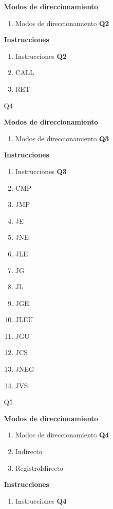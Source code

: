 \textbf{Modos de direccionamiento}
\begin{enumerate}
\item Modos de direccionamiento \textbf{Q2}
\end{enumerate}

\textbf{Instrucciones}
\begin{enumerate}
\item Instrucciones \textbf{Q2}
\item CALL
\item RET
\end{enumerate}

{Q4}

\textbf{Modos de direccionamiento}
\begin{enumerate}
\item Modos de direccionamiento \textbf{Q3}
\end{enumerate}

\textbf{Instrucciones}
\begin{enumerate}
\item Instrucciones \textbf{Q3}
\item CMP
\item JMP
\item JE 
\item JNE 
\item JLE 
\item JG 
\item JL 
\item JGE 
\item JLEU 
\item JGU 
\item JCS 
\item JNEG 
\item JVS
\end{enumerate}

{Q5}

\textbf{Modos de direccionamiento}
\begin{enumerate}
\item Modos de direccionamiento \textbf{Q4}
\item Indirecto
\item RegistroIdirecto
\end{enumerate}

\textbf{Instrucciones}
\begin{enumerate}
\item Instrucciones \textbf{Q4}
\end{enumerate}

